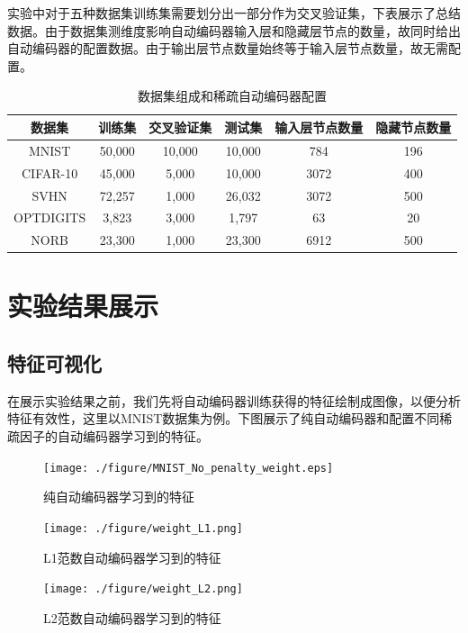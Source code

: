 \documentclass[oneside]{ZJUthesis}
\begin{document}
实验中对于五种数据集训练集需要划分出一部分作为交叉验证集，下表展示了总结数据。由于数据集测维度影响自动编码器输入层和隐藏层节点的数量，故同时给出自动编码器的配置数据。由于输出层节点数量始终等于输入层节点数量，故无需配置。
\begin{table}[h]
\begin{center}
{
\caption{数据集组成和稀疏自动编码器配置}\label{datasetconfig}}
\begin{tabular}{|c|c|c|c|c|c|}
\hline
数据集& 训练集&交叉验证集&测试集&输入层节点数量&隐藏节点数量\\
\hline
MNIST & 50,000 & 10,000 & 10,000 & 784 & 196 \\
\hline
CIFAR-10 & 45,000 & 5,000 & 10,000 & 3072 & 400 \\
\hline
SVHN  & 72,257 & 1,000 & 26,032 & 3072 & 500 \\
\hline
OPTDIGITS & 3,823 & 3,000 & 1,797 & 63 & 20 \\
\hline
NORB  & 23,300 & 1,000 & 23,300 & 6912 & 500 \\
\hline
\end{tabular}
\end{center}
\end{table}



\section{实验结果展示}
\subsection{特征可视化}
在展示实验结果之前，我们先将自动编码器训练获得的特征绘制成图像，以便分析特征有效性，这里以MNIST数据集为例。下图展示了纯自动编码器和配置不同稀疏因子的自动编码器学习到的特征。



\begin{figure}[h] 
\centering
\texttt{[image: ./figure/MNIST\_No\_penalty\_weight.eps]}
\caption{纯自动编码器学习到的特征\label{fig:no}}
\end{figure}

\begin{figure}[h] 
\centering
\texttt{[image: ./figure/weight\_L1.png]}
\caption{L1范数自动编码器学习到的特征\label{fig:l1}}
\end{figure}

\begin{figure}[h] 
\centering
\texttt{[image: ./figure/weight\_L2.png]}
\caption{L2范数自动编码器学习到的特征\label{fig:l2}}
\end{figure}
\end{document}
